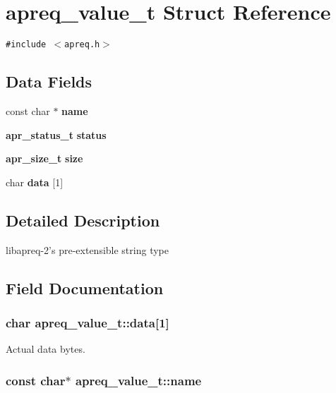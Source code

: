 \section{apreq\_\-value\_\-t Struct Reference}
\label{structapreq__value__t}
{\tt \#include $<$apreq.h$>$}

\subsection*{Data Fields}
\begin{CompactItemize}
\item 
const char $\ast$ {\bf name}
\item 
{\bf apr\_\-status\_\-t} {\bf status}
\item 
{\bf apr\_\-size\_\-t} {\bf size}
\item 
char {\bf data} [1]
\end{CompactItemize}


\subsection{Detailed Description}
libapreq-2's pre-extensible string type 



\subsection{Field Documentation}
\subsubsection{\setlength{\rightskip}{0pt plus 5cm}char apreq\_\-value\_\-t::data[1]}\label{structapreq__value__t_m3}


Actual data bytes. 
\subsubsection{\setlength{\rightskip}{0pt plus 5cm}const char$\ast$ apreq\_\-value\_\-t::name}\label{structapreq__value__t_m0}


